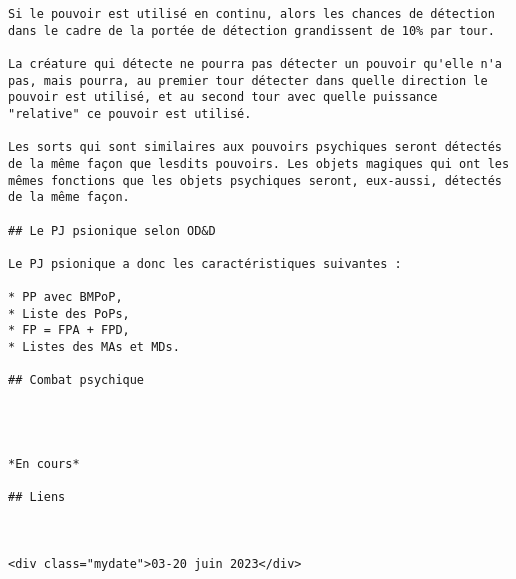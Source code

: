 \documentclass[11pt]{article}
\begin{document}
\begin{verbatim}
Si le pouvoir est utilisé en continu, alors les chances de détection dans le cadre de la portée de détection grandissent de 10% par tour.

La créature qui détecte ne pourra pas détecter un pouvoir qu'elle n'a pas, mais pourra, au premier tour détecter dans quelle direction le pouvoir est utilisé, et au second tour avec quelle puissance "relative" ce pouvoir est utilisé.

Les sorts qui sont similaires aux pouvoirs psychiques seront détectés de la même façon que lesdits pouvoirs. Les objets magiques qui ont les mêmes fonctions que les objets psychiques seront, eux-aussi, détectés de la même façon.

## Le PJ psionique selon OD&D

Le PJ psionique a donc les caractéristiques suivantes :

* PP avec BMPoP,
* Liste des PoPs,
* FP = FPA + FPD,
* Listes des MAs et MDs.

## Combat psychique




*En cours*

## Liens



<div class="mydate">03-20 juin 2023</div>


\end{verbatim}
\end{document}
